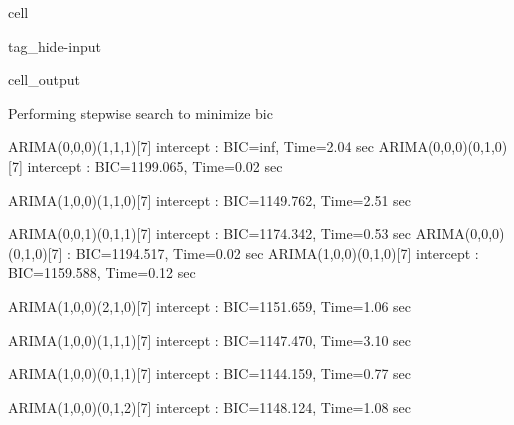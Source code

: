\documentclass[letterpaper,10pt,english]{jupyterBook}
\begin{document}
\begin{sphinxuseclass}{cell}
\begin{sphinxuseclass}{tag_hide-input}
\begin{sphinxuseclass}{cell_output}
\begin{sphinxVerbatim}[commandchars=\\\{\}]
Performing stepwise search to minimize bic
\end{sphinxVerbatim}

\begin{sphinxVerbatim}[commandchars=\\\{\}]
 ARIMA(0,0,0)(1,1,1)[7] intercept   : BIC=inf, Time=2.04 sec
 ARIMA(0,0,0)(0,1,0)[7] intercept   : BIC=1199.065, Time=0.02 sec
\end{sphinxVerbatim}

\begin{sphinxVerbatim}[commandchars=\\\{\}]
 ARIMA(1,0,0)(1,1,0)[7] intercept   : BIC=1149.762, Time=2.51 sec
\end{sphinxVerbatim}

\begin{sphinxVerbatim}[commandchars=\\\{\}]
 ARIMA(0,0,1)(0,1,1)[7] intercept   : BIC=1174.342, Time=0.53 sec
 ARIMA(0,0,0)(0,1,0)[7]             : BIC=1194.517, Time=0.02 sec
 ARIMA(1,0,0)(0,1,0)[7] intercept   : BIC=1159.588, Time=0.12 sec
\end{sphinxVerbatim}

\begin{sphinxVerbatim}[commandchars=\\\{\}]
 ARIMA(1,0,0)(2,1,0)[7] intercept   : BIC=1151.659, Time=1.06 sec
\end{sphinxVerbatim}

\begin{sphinxVerbatim}[commandchars=\\\{\}]
 ARIMA(1,0,0)(1,1,1)[7] intercept   : BIC=1147.470, Time=3.10 sec
\end{sphinxVerbatim}

\begin{sphinxVerbatim}[commandchars=\\\{\}]
 ARIMA(1,0,0)(0,1,1)[7] intercept   : BIC=1144.159, Time=0.77 sec
\end{sphinxVerbatim}

\begin{sphinxVerbatim}[commandchars=\\\{\}]
 ARIMA(1,0,0)(0,1,2)[7] intercept   : BIC=1148.124, Time=1.08 sec
\end{sphinxVerbatim}


\end{sphinxuseclass}
\end{sphinxuseclass}
\end{sphinxuseclass}
\end{document}
